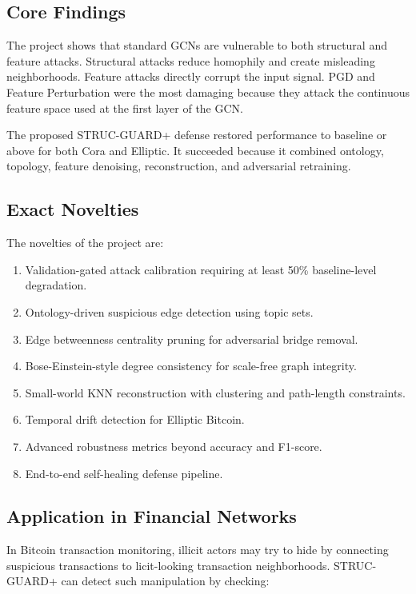 \documentclass[12pt,a4paper]{article}
\begin{document}
\subsection{Core Findings}
The project shows that standard GCNs are vulnerable to both structural and feature attacks. Structural attacks reduce homophily and create misleading neighborhoods. Feature attacks directly corrupt the input signal. PGD and Feature Perturbation were the most damaging because they attack the continuous feature space used at the first layer of the GCN.

The proposed STRUC-GUARD+ defense restored performance to baseline or above for both Cora and Elliptic. It succeeded because it combined ontology, topology, feature denoising, reconstruction, and adversarial retraining.

\subsection{Exact Novelties}
The novelties of the project are:

\begin{enumerate}
    \item Validation-gated attack calibration requiring at least 50\% baseline-level degradation.
    \item Ontology-driven suspicious edge detection using topic sets.
    \item Edge betweenness centrality pruning for adversarial bridge removal.
    \item Bose-Einstein-style degree consistency for scale-free graph integrity.
    \item Small-world KNN reconstruction with clustering and path-length constraints.
    \item Temporal drift detection for Elliptic Bitcoin.
    \item Advanced robustness metrics beyond accuracy and F1-score.
    \item End-to-end self-healing defense pipeline.
\end{enumerate}

\subsection{Application in Financial Networks}
In Bitcoin transaction monitoring, illicit actors may try to hide by connecting suspicious transactions to licit-looking transaction neighborhoods. STRUC-GUARD+ can detect such manipulation by checking:
\end{document}
